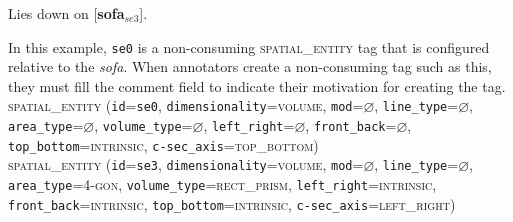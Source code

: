 \documentclass[11pt]{article}
\newcommand{\entity}[2]{[\textbf{\color{darkblue}#1}$_{se#2}$]}
\newenvironment{note}
{\list{}
 {\setlength
  {\itemindent}
  {\listparindent}}
   \item[\textbf{Note:}]\relax}
{\endlist}
\begin{document}
{    \item \entity{}{0} Lies down on \entity{sofa}{3}.
        \begin{note}
            In this example, \texttt{se0} is a non-consuming \textsc{spatial\_entity} tag that is configured relative to the \emph{sofa}. When annotators create a non-consuming tag such as this, they must fill the comment field to indicate their motivation for creating the tag.
        \end{note}
        \textsc{spatial\_entity}
            (\texttt{id}=\texttt{se0},
            \texttt{dimensionality}=\textsc{volume},
            \texttt{mod}=$\varnothing$,
            \texttt{line\_type}=$\varnothing$,\\
            \texttt{area\_type}=$\varnothing$,
            \texttt{volume\_type}=$\varnothing$,
            \texttt{left\_right}=$\varnothing$,
            \texttt{front\_back}=$\varnothing$,\\
            \texttt{top\_bottom}=\textsc{intrinsic},
            \texttt{c-sec\_axis}=\textsc{top\_bottom})\vspace{0.5em}\\
        \textsc{spatial\_entity}
            (\texttt{id}=\texttt{se3},
            \texttt{dimensionality}=\textsc{volume},
            \texttt{mod}=$\varnothing$,
            \texttt{line\_type}=$\varnothing$,\\
            \texttt{area\_type}=\textsc{4-gon},
            \texttt{volume\_type}=\textsc{rect\_prism},
            \texttt{left\_right}=\textsc{intrinsic},\\
            \texttt{front\_back}=\textsc{intrinsic},
            \texttt{top\_bottom}=\textsc{intrinsic},
            \texttt{c-sec\_axis}=\textsc{left\_right})
        \label{ex:sofa}
        
}
\end{document}
